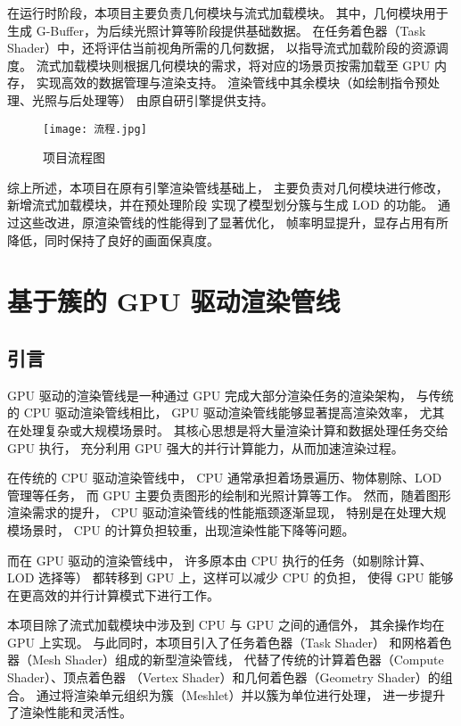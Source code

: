 \par 在运行时阶段，本项目主要负责几何模块与流式加载模块。  
其中，几何模块用于生成 G-Buffer，为后续光照计算等阶段提供基础数据。  
在任务着色器（Task Shader）中，还将评估当前视角所需的几何数据，  
以指导流式加载阶段的资源调度。  
流式加载模块则根据几何模块的需求，将对应的场景页按需加载至 GPU 内存，  
实现高效的数据管理与渲染支持。  
渲染管线中其余模块（如绘制指令预处理、光照与后处理等）  
由原自研引擎提供支持。

\begin{figure}[ht]
    \centering
    \texttt{[image: 流程.jpg]}
    \caption{\label{fig:流程}项目流程图}
\end{figure}

\par 综上所述，本项目在原有引擎渲染管线基础上，  
主要负责对几何模块进行修改，新增流式加载模块，并在预处理阶段  
实现了模型划分簇与生成 LOD 的功能。
通过这些改进，原渲染管线的性能得到了显著优化，  
帧率明显提升，显存占用有所降低，同时保持了良好的画面保真度。

\section{基于簇的 GPU 驱动渲染管线}

\subsection{引言}

GPU 驱动的渲染管线是一种通过 GPU 完成大部分渲染任务的渲染架构，
与传统的 CPU 驱动渲染管线相比，
GPU 驱动渲染管线能够显著提高渲染效率，
尤其在处理复杂或大规模场景时。
其核心思想是将大量渲染计算和数据处理任务交给 GPU 执行，
充分利用 GPU 强大的并行计算能力，从而加速渲染过程。

在传统的 CPU 驱动渲染管线中，
CPU 通常承担着场景遍历、物体剔除、LOD 管理等任务，
而 GPU 主要负责图形的绘制和光照计算等工作。
然而，随着图形渲染需求的提升，
CPU 驱动渲染管线的性能瓶颈逐渐显现，
特别是在处理大规模场景时，
CPU 的计算负担较重，出现渲染性能下降等问题。

而在 GPU 驱动的渲染管线中，
许多原本由 CPU 执行的任务（如剔除计算、LOD 选择等）
都转移到 GPU 上，这样可以减少 CPU 的负担，
使得 GPU 能够在更高效的并行计算模式下进行工作。

本项目除了流式加载模块中涉及到 CPU 与 GPU 之间的通信外，
其余操作均在 GPU 上实现。
与此同时，本项目引入了任务着色器（Task Shader）
和网格着色器（Mesh Shader）组成的新型渲染管线，
代替了传统的计算着色器（Compute Shader）、顶点着色器
（Vertex Shader）和几何着色器（Geometry Shader）的组合。
通过将渲染单元组织为簇（Meshlet）并以簇为单位进行处理，
进一步提升了渲染性能和灵活性。

